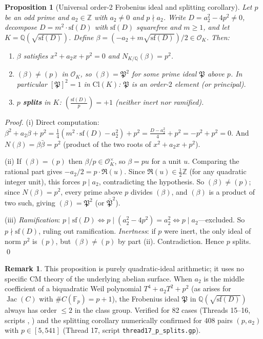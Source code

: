\documentclass[11pt,a4paper]{article}
\newtheorem{proposition}[theorem]{Proposition}
\theoremstyle{definition}
\newtheorem{remark}[theorem]{Remark}
\newcommand{\FF}{\mathbb{F}}
\newcommand{\ZZ}{\mathbb{Z}}
\newcommand{\QQ}{\mathbb{Q}}
\newcommand{\Jac}{\operatorname{Jac}}
\begin{document}
\begin{proposition}[Universal order-2 Frobenius ideal and splitting corollary]%
\label{prop:order2-frobenius}
Let $p$ be an odd prime and $a_2 \in \ZZ$ with $a_2 \neq 0$ and $p \nmid a_2$.
Write $D = a_2^2 - 4p^2 \neq 0$, decompose $D = m^2 \cdot \mathrm{sf}(D)$ with
$\mathrm{sf}(D)$ squarefree and $m \geq 1$, and let $K = \QQ(\sqrt{\mathrm{sf}(D)})$.
Define $\beta = (-a_2 + m\sqrt{\mathrm{sf}(D)})/2 \in \mathcal{O}_K$.  Then:
\begin{enumerate}[label=(\roman*)]
  \item $\beta$ satisfies $x^2 + a_2 x + p^2 = 0$ and $N_{K/\QQ}(\beta) = p^2$.
  \item $(\beta) \neq (p)$ in $\mathcal{O}_K$, so $(\beta) = \mathfrak{P}^2$
        for some prime ideal $\mathfrak{P}$ above $p$.
        In particular $[\mathfrak{P}]^2 = 1$ in $\mathrm{Cl}(K)$:
        $\mathfrak{P}$ is an \emph{order-$2$ element} (or principal).
  \item $p$ \textbf{splits} in $K$\textup{:} $\left(\frac{\mathrm{sf}(D)}{p}\right) = +1$
        (neither inert nor ramified).
\end{enumerate}
\end{proposition}

\begin{proof}
(i) Direct computation: $\beta^2 + a_2\beta + p^2
    = \tfrac{1}{4}(m^2 \cdot \mathrm{sf}(D) - a_2^2) + p^2
    = \tfrac{D - a_2^2}{4} + p^2 = -p^2 + p^2 = 0$.
And $N(\beta) = \beta\bar\beta = p^2$ (product of the two roots of $x^2+a_2 x+p^2$).

(ii) If $(\beta) = (p)$ then $\beta/p \in \mathcal{O}_K^\times$, so
$\beta = p u$ for a unit $u$.  Comparing the rational part gives $-a_2/2 = p \cdot \Re(u)$.
Since $\Re(u) \in \tfrac{1}{2}\ZZ$ (for any quadratic integer unit), this forces $p \mid a_2$,
contradicting the hypothesis.  So $(\beta) \neq (p)$; since $N(\beta)=p^2$, every prime
above $p$ divides $(\beta)$, and $(\beta)$ is a product of two such, giving
$(\beta) = \mathfrak{P}^2$ (or $\bar{\mathfrak{P}}^2$).

(iii) \emph{Ramification}: $p \mid \mathrm{sf}(D) \Leftrightarrow
p \mid (a_2^2 - 4p^2) = a_2^2 \Leftrightarrow p \mid a_2$---excluded.
So $p \nmid \mathrm{sf}(D)$, ruling out ramification.
\emph{Inertness}: if $p$ were inert, the only ideal of norm $p^2$ is $(p)$,
but $(\beta) \neq (p)$ by part (ii). Contradiction.
Hence $p$ splits. \qed
\end{proof}

\begin{remark}
This proposition is purely quadratic-ideal arithmetic; it uses no specific CM theory of
the underlying abelian surface.  When $a_2$ is the middle coefficient of a biquadratic
Weil polynomial $T^4 + a_2 T^2 + p^2$ (as arises for $\Jac(C)$ with $\#C(\FF_p)=p+1$),
the Frobenius ideal $\mathfrak{P}$ in $\QQ(\sqrt{\mathrm{sf}(D)})$ always has order $\leq 2$
in the class group.  Verified for 82 cases (Threads 15--16, scripts
, ) and
the splitting corollary numerically confirmed for 408 pairs $(p, a_2)$
with $p \in [5, 541]$ (Thread 17, script \texttt{thread17\_p\_splits.gp}).
\end{remark}
\end{document}
